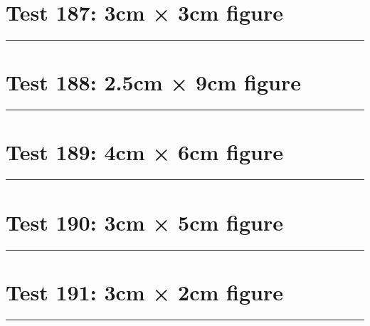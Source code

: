 \documentclass[a4paper,11pt]{article}
\begin{document}
\section*{Test 187: 3cm × 3cm figure}
\begin{swarmwrap}%
  \begin{minipage}[t]{3cm}
    \centering
    \rule{\linewidth}{3cm}
  \end{minipage}%
\end{swarmwrap}%
\swarmwrapnext
\lipsum[51]
\lipsum[52]
\lipsum[53]
\lipsum[54]
\section*{Test 188: 2.5cm × 9cm figure}
\begin{swarmwrap}%
  \begin{minipage}[t]{2cm}
    \centering
    \rule{\linewidth}{9cm}
  \end{minipage}%
\end{swarmwrap}%
\swarmwrapnext
\lipsum[136]
\lipsum[137]
\lipsum[138]
\lipsum[139]
\lipsum[140]
\section*{Test 189: 4cm × 6cm figure}
\begin{swarmwrap}%
  \begin{minipage}[t]{4cm}
    \centering
    \rule{\linewidth}{6cm}
  \end{minipage}%
\end{swarmwrap}%
\swarmwrapnext
\lipsum[51]
\lipsum[52]
\lipsum[53]
\section*{Test 190: 3cm × 5cm figure}
\begin{swarmwrap}%
  \begin{minipage}[t]{3cm}
    \centering
    \rule{\linewidth}{5cm}
  \end{minipage}%
\end{swarmwrap}%
\swarmwrapnext
\lipsum[47]
\lipsum[48]
\lipsum[49]
\lipsum[50]
\lipsum[51]
\section*{Test 191: 3cm × 2cm figure}
\begin{swarmwrap}%
  \begin{minipage}[t]{3cm}
    \centering
    \rule{\linewidth}{2cm}
  \end{minipage}%
\end{swarmwrap}%
\swarmwrapnext
\lipsum[72]
\lipsum[73]
\lipsum[74]
\lipsum[75]
\end{document}
